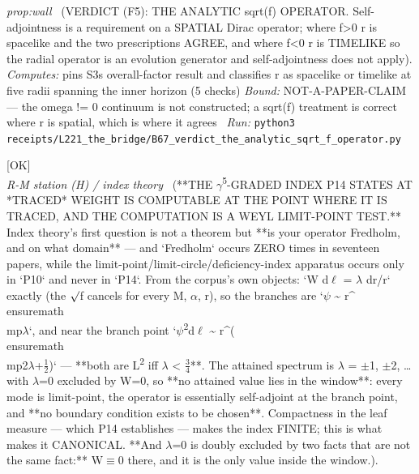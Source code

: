 \begin{description}
\textit{prop:wall} \ (VERDICT (F5): THE ANALYTIC sqrt(f) OPERATOR. Self-adjointness is a requirement on a SPATIAL Dirac operator; where f>0 r is spacelike and the two prescriptions AGREE, and where f<0 r is TIMELIKE so the radial operator is an evolution generator and self-adjointness does not apply). 
\emph{Computes:} pins S3s overall-factor result and classifies r as spacelike or timelike at five radii spanning the inner horizon (5 checks)
 \emph{Bound:} NOT-A-PAPER-CLAIM --- the omega != 0 continuum is not constructed; a sqrt(\textbar{}f\textbar{}) treatment is correct where r is spatial, which is where it agrees
\ \emph{Run:} \texttt{python3 receipts/L221\_the\_bridge/B67\_verdict\_the\_analytic\_sqrt\_f\_operator.py}
\item[\label{rcpt:K1_the_traced_index_is_computable_and_the_computation_is_a_limit_point_test}\textbf{}\quad\texttt{K1\_the\_traced\_index\_is\_computable\_and\_the\_computation\_is\_a\_limit\_point\_test}]\hfill\textsf{[OK]}\\
\textit{R-M station (H) / index theory} \ (**THE \ensuremath{\gamma}\textsuperscript{5}-GRADED INDEX P14 STATES AT *TRACED* WEIGHT IS COMPUTABLE AT THE POINT WHERE IT IS TRACED, AND THE COMPUTATION IS A WEYL LIMIT-POINT TEST.** Index theory's first question is not a theorem but **is your operator Fredholm, and on what domain** --- and `Fredholm` occurs ZERO times in seventeen papers, while the limit-point/limit-circle/deficiency-index apparatus occurs only in `P10` and never in `P14`. From the corpus's own objects: `W d\ensuremath{\ell} = \ensuremath{\lambda} dr/r` exactly (the \ensuremath{\surd}f cancels for every M, \ensuremath{\alpha}, r), so the branches are `\ensuremath{\psi} \textasciitilde{} r\textasciicircum{}\\ensuremath{\\mp}\ensuremath{\lambda}`, and near the branch point `\textbar{}\ensuremath{\psi}\textbar{}\textsuperscript{2}d\ensuremath{\ell} \textasciitilde{} r\textasciicircum{}(\\ensuremath{\\mp}2\ensuremath{\lambda}+\ensuremath{\tfrac12})` --- **both are L\textsuperscript{2} iff \textbar{}\ensuremath{\lambda}\textbar{} < \ensuremath{\tfrac34}**. The attained spectrum is \ensuremath{\lambda} = \ensuremath{\pm}1, \ensuremath{\pm}2, \ldots{} with \ensuremath{\lambda}=0 excluded by W=0, so **no attained value lies in the window**: every mode is limit-point, the operator is essentially self-adjoint at the branch point, and **no boundary condition exists to be chosen**. Compactness in the leaf measure --- which P14 establishes --- makes the index FINITE; this is what makes it CANONICAL. **And \ensuremath{\lambda}=0 is doubly excluded by two facts that are not the same fact:** W\ensuremath{\equiv}0 there, and it is the only value inside the window.). 

\end{description}
